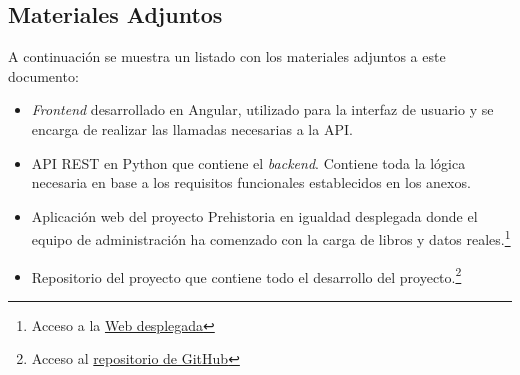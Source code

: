 \subsection{Materiales Adjuntos}
A continuación se muestra un listado con los materiales adjuntos a este documento:
\begin{itemize}
    \item \textit{Frontend} desarrollado en Angular, utilizado para la interfaz de usuario y se encarga de realizar las llamadas necesarias a la API.
    \item API REST en Python que contiene el \textit{backend}. Contiene toda la lógica necesaria en base a los requisitos funcionales establecidos en los anexos.
    \item Aplicación web del proyecto Prehistoria en igualdad desplegada donde el equipo de administración ha comenzado con la carga de libros y datos reales.\footnote{Acceso a la \href{https://prehistoriaenigualdad.netlify.app/}{Web desplegada}}
    \item Repositorio del proyecto que contiene todo el desarrollo del proyecto.\footnote{Acceso al \href{https://github.com/DanielFernandezFdez/TFG\_GII\_23.23}{repositorio de GitHub}}
\end{itemize}
 